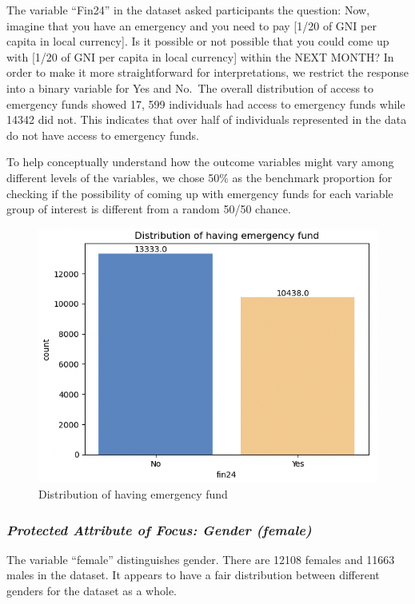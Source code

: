 \documentclass[12pt]{article}
\begin{document}
The variable ``Fin24'' in the dataset asked participants the question:
Now, imagine that you have an emergency and you need to pay {[}1/20 of
GNI per capita in local currency{]}. Is it possible or not possible that
you could come up with {[}1/20 of GNI per capita in local currency{]}
within the NEXT MONTH? In order to make it more straightforward for
interpretations, we restrict the response into a binary variable for Yes
and No.~The overall distribution of access to emergency funds showed 17,
599 individuals had access to emergency funds while 14342 did not. This
indicates that over half of individuals represented in the data do not
have access to emergency funds.

To help conceptually understand how the outcome variables might vary
among different levels of the variables, we chose 50\% as the benchmark
proportion for checking if the possibility of coming up with emergency
funds for each variable group of interest is different from a random
50/50 chance.

\begin{figure}

{\centering \includegraphics[width=0.7\linewidth]{graphs/f24_graph1} 

}

\caption{Distribution of having emergency fund}\label{fig:unnamed-chunk-4}
\end{figure}

\hypertarget{protected-attribute-of-focus-gender-female}{%
\subsubsection{\texorpdfstring{\emph{Protected Attribute of Focus:
Gender
(female)}}{Protected Attribute of Focus: Gender (female)}}\label{protected-attribute-of-focus-gender-female}}

The variable ``female'' distinguishes gender. There are 12108 females
and 11663 males in the dataset. It appears to have a fair distribution
between different genders for the dataset as a whole.
\end{document}
